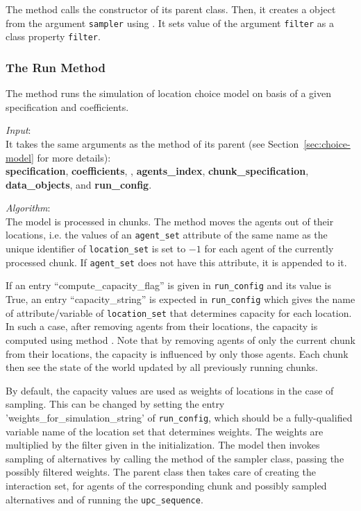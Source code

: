 The method calls the constructor of its parent class. Then, it creates a
 object from the argument \verb|sampler| using
. It sets value of the argument \verb|filter| as a class
property \verb|filter|.

%
\subsubsection{The Run Method}
%
The  method runs the simulation of location choice model \modelsindex on basis
of a given specification and coefficients. \coefficientsindex

{\it Input}:\\[1mm]
It takes the same arguments as the  method of its parent (see
Section~\ref{sec:choice-model} for more details): \\
{\bf specification}, {\bf coefficients}, , {\bf agents_index},
{\bf chunk_specification}, {\bf data_objects}, and {\bf run_config}.

{\it Algorithm}:\\[1mm]
The model \modelsindex is processed in chunks. The  method moves
the agents out of their locations, i.e. the values of an
\verb|agent_set| attribute of the same name as the unique identifier of
\verb|location_set| is set to $-1$ for each agent of the currently processed
chunk. If \verb|agent_set| does not have this attribute, \attributesindex it is appended to it.

If an entry ``compute_capacity_flag'' is given in \verb|run_config| and its
value is True, an entry ``capacity_string'' is expected in \verb|run_config|
which gives the name of attribute/variable \attributesindex\variablesindex of \verb|location_set| that
determines capacity for each location. In such a case, after removing agents
from their locations, the capacity is computed using method
. Note that by removing agents of only the
current chunk from their locations, the capacity is influenced by only those
agents. Each chunk then see the state of the world updated by all previously
running chunks.

By default, the capacity values are used as weights of locations in the case of sampling.
This can be changed by setting the entry 'weights_for_simulation_string' of \verb|run_config|, 
which should be a fully-qualified variable name of the location set that determines weights. 
The weights are multiplied by the filter given in the initialization.  The
model \modelsindex then invokes sampling of alternatives by calling the
 method of the sampler class, passing the possibly filtered
weights. The parent class then takes care of creating the interaction set, for
agents of the corresponding chunk and possibly sampled alternatives and of
running the \verb|upc_sequence|. 

